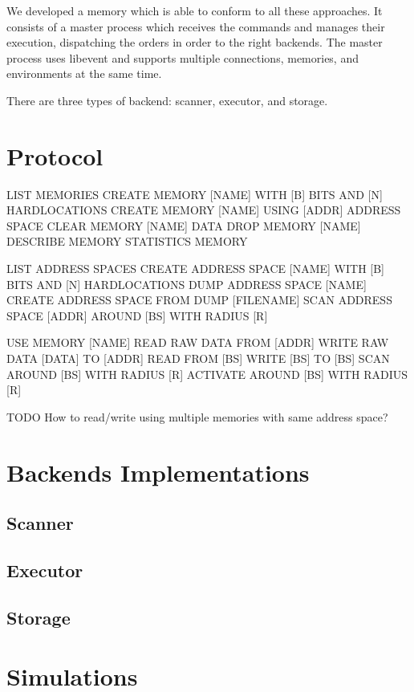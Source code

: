 \documentclass[12pt]{article}
\begin{document}
We developed a memory which is able to conform to all these approaches. It consists of a master process which receives the commands and manages their execution, dispatching the orders in order to the right backends. The master process uses libevent and supports multiple connections, memories, and environments at the same time.

There are three types of backend: scanner, executor, and storage.


\section{Protocol}

LIST MEMORIES
CREATE MEMORY [NAME] WITH [B] BITS AND [N] HARDLOCATIONS
CREATE MEMORY [NAME] USING [ADDR] ADDRESS SPACE
CLEAR MEMORY [NAME] DATA
DROP MEMORY [NAME]
DESCRIBE MEMORY
STATISTICS MEMORY

LIST ADDRESS SPACES
CREATE ADDRESS SPACE [NAME] WITH [B] BITS AND [N] HARDLOCATIONS
DUMP ADDRESS SPACE [NAME]
CREATE ADDRESS SPACE FROM DUMP [FILENAME]
SCAN ADDRESS SPACE [ADDR] AROUND [BS] WITH RADIUS [R]

USE MEMORY [NAME]
READ RAW DATA FROM [ADDR]
WRITE RAW DATA [DATA] TO [ADDR]
READ FROM [BS]
WRITE [BS] TO [BS]
SCAN AROUND [BS] WITH RADIUS [R]
ACTIVATE AROUND [BS] WITH RADIUS [R]

TODO How to read/write using multiple memories with same address space?

\section{Backends Implementations}

\subsection{Scanner}
\subsection{Executor}
\subsection{Storage}


\section{Simulations}

%


\end{document}
